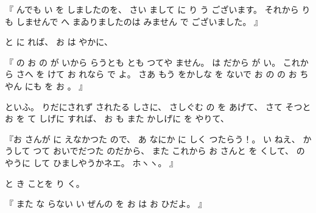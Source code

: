 %
『
んでも
い
を
しましたのを、
%
さい
まして
に
%
り
う
ございます。
%
それから
りも
しませんで
へ
まゐりましたのは
みません
で
ございました。
』

%
と
に
れば、
%
お
は
やかに、

%
『
の
お
の
が
いから
らうとも
とも
つてや
ません。
%
は
だから
が
い。
%
これから
さへ
を
けて
%
お
れなら
で
よ。
%
さあ
もう
をかしな
を
ないで
お
の
の
お
ちやん
にも
を
お
。
』

%
といふ。
%
りだにされず
されたる
しさに、
%
さしぐむ
の
を
あげて、
%
さて
そつと
お
を
て
しげに
すれば、
%
お
も
%
また
かしげに
を
やりて、

%
『お
さんが
に
えなかつた
ので、
%
あ
なにか
に
しく
つたらう！。
%
い
ねえ、
%
かうして
つて
おいでだつた
のだから、
%
また
これから
お
さんと
を
くして、
%
のやうに
して
ひましやうかネエ。
%
ホヽヽ。
』

%
と
き
ことを
り
く。

%
『
また
な
らない
い
ぜんの
を
お
は
お
ひだよ。
』

